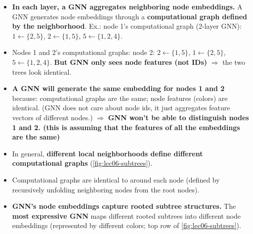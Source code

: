 \begin{itemize}
  \item \textbf{In each layer, a GNN aggregates neighboring node embeddings.} A
    GNN generates node embeddings through a \textbf{computational graph defined by
    the neighborhood}. Ex.: node 1's computational graph (2-layer GNN):
    $1\leftarrow\{2,5\}$, $2\leftarrow\{1,5\}$, $5\leftarrow\{1,2,4\}$.
  \item Nodes 1 and 2's computational graphs: node 2: $2\leftarrow\{1,5\}$,
    $1\leftarrow\{2,5\}$, $5\leftarrow\{1,2,4\}$. \textbf{But GNN only sees node
    features (not IDs)} $\Rightarrow$ the two trees look identical.
  \item \textbf{A GNN will generate the same embedding for nodes 1 and 2}
    because: computational graphs are the same; node features (colors) are
    identical. (GNN does not care about node ids, it just aggregates feature
    vectors of different nodes.) $\Rightarrow$ \textbf{GNN won't be able to
    distinguish nodes 1 and 2. (this is assuming that the features of all the embeddings are the same)}
  \item In general, \textbf{different local neighborhoods define different
    computational graphs} (\cref{fig:lec06-subtrees}).
  \item Computational graphs are identical to 
    around each node (defined by recursively unfolding neighboring nodes from the
    root nodes).
  \item \textbf{GNN's node embeddings capture rooted subtree structures.} The
    \textbf{most expressive GNN} maps different rooted subtrees into different node
    embeddings (represented by different colors; top row of
    \cref{fig:lec06-subtrees}).
\end{itemize}

